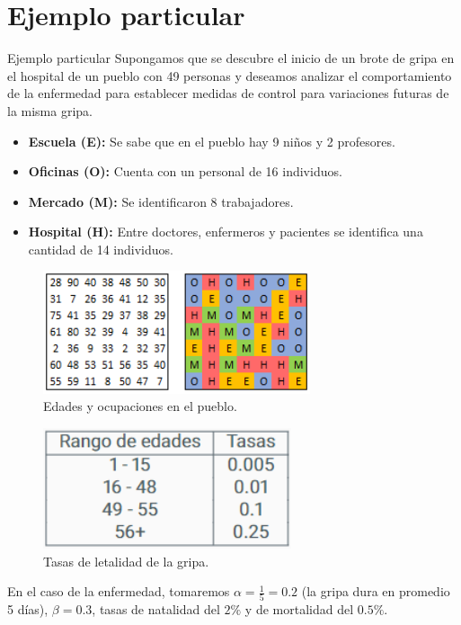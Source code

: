 \documentclass[9pt]{beamer}
\begin{document}
\section{Ejemplo particular}
\begin{frame}{Ejemplo particular}
Supongamos que se descubre el inicio de un brote de gripa en el hospital de un pueblo con 49 personas y deseamos analizar el comportamiento de la enfermedad para establecer medidas de control para variaciones futuras de la misma gripa.
\begin{itemize}
    \item \textbf{Escuela (E):} Se sabe que en el pueblo hay 9 niños y 2 profesores.
    \item \textbf{Oficinas (O):} Cuenta con un personal de 16 individuos.
    \item \textbf{Mercado (M):} Se identificaron 8 trabajadores.
    \item \textbf{Hospital (H):} Entre doctores, enfermeros y pacientes se identifica una cantidad de 14 individuos.
\end{itemize}
\begin{minipage}{0.48\textwidth}
\begin{figure}[h]
  \centering
    \includegraphics[width=0.7\textwidth]{Imagenes/edadesYOcupaciones.PNG}
    \caption{Edades y ocupaciones en el pueblo.}
    \label{fig:edadesYOcupaciones}
\end{figure}
\end{minipage}
\hfill
\begin{minipage}{0.48\textwidth}
\begin{figure}[h]
  \centering
    \includegraphics[width=0.65\textwidth]{Imagenes/tasasDeLetalidad_ex_Pueblo.png}
    \caption{Tasas de letalidad de la gripa.}
\end{figure}
\end{minipage}

En el caso de la enfermedad, tomaremos $\alpha=\frac{1}{5}=0.2$ (la gripa dura en promedio 5 días), $\beta=0.3$, tasas de natalidad del $2\%$ y de mortalidad del $0.5\%$.
\end{frame}
\end{document}
